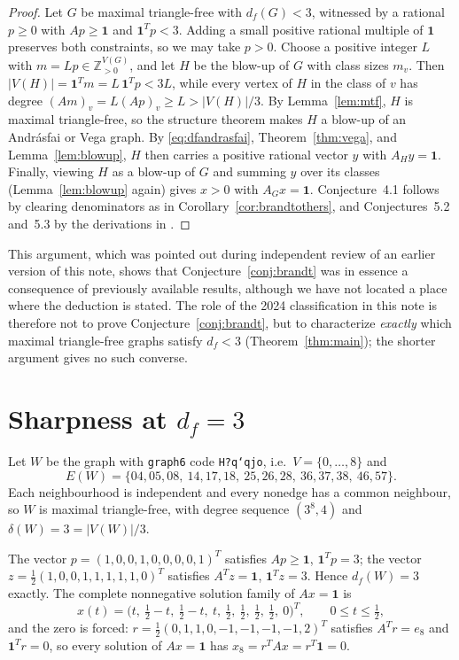 \documentclass[11pt]{article}
\theoremstyle{definition}
\theoremstyle{remark}
\newcommand{\df}{d_f}
\newcommand{\ones}{\mathbf 1}
\begin{document}
\begin{proof}
Let $G$ be maximal triangle-free with $\df(G)<3$, witnessed by a rational $p\ge0$ with
$Ap\ge\ones$ and $\ones^Tp<3$. Adding a small positive rational multiple of $\ones$
preserves both constraints, so we may take $p>0$. Choose a positive integer $L$ with
$m=Lp\in\mathbb Z_{>0}^{V(G)}$, and let $H$ be the blow-up of $G$ with class sizes $m_v$.
Then $|V(H)|=\ones^Tm=L\,\ones^Tp<3L$, while every vertex of $H$ in the class of $v$ has
degree $(Am)_v=L(Ap)_v\ge L>|V(H)|/3$. By Lemma~\ref{lem:mtf}, $H$ is maximal
triangle-free, so the structure theorem makes $H$ a blow-up of an Andr\'asfai or Vega
graph. By \eqref{eq:dfandrasfai}, Theorem~\ref{thm:vega}, and Lemma~\ref{lem:blowup}, $H$
then carries a positive rational vector $y$ with $A_Hy=\ones$. Finally, viewing $H$ as a
blow-up of $G$ and summing $y$ over its classes (Lemma~\ref{lem:blowup} again) gives $x>0$
with $A_Gx=\ones$. Conjecture~4.1 follows by clearing denominators as in
Corollary~\ref{cor:brandtothers}, and Conjectures~5.2 and~5.3 by the derivations in
\cite[Section~5]{Brandt2002}.
\end{proof}

This argument, which was pointed out during independent review of an earlier version of
this note, shows that Conjecture~\ref{conj:brandt} was in essence a consequence of
previously available results, although we have not located a place where the deduction is
stated. The role of the 2024 classification \cite{LPR} in this note is therefore not to
prove Conjecture~\ref{conj:brandt}, but to characterize \emph{exactly} which maximal
triangle-free graphs satisfy $\df<3$ (Theorem~\ref{thm:main}); the shorter argument gives
no such converse.

\section{Sharpness at $\df=3$}\label{sec:sharp}

Let $W$ be the graph with \texttt{graph6} code \texttt{H?q`qjo}, i.e.\ $V=\{0,\dots,8\}$ and
\[
E(W)=\{04,05,08,\ 14,17,18,\ 25,26,28,\ 36,37,38,\ 46,57\}.
\]
Each neighbourhood is independent and every nonedge has a common neighbour, so $W$ is
maximal triangle-free, with degree sequence $(3^8,4)$ and $\delta(W)=3=|V(W)|/3$.

The vector $p=(1,0,0,1,0,0,0,0,1)^T$ satisfies $Ap\ge\ones$, $\ones^Tp=3$; the vector
$z=\tfrac12(1,0,0,1,1,1,1,1,0)^T$ satisfies $A^Tz=\ones$, $\ones^Tz=3$. Hence $\df(W)=3$
exactly. The complete nonnegative solution family of $Ax=\ones$ is
\[
x(t)=\bigl(t,\ \tfrac12-t,\ \tfrac12-t,\ t,\ \tfrac12,\ \tfrac12,\ \tfrac12,\ \tfrac12,\ 0\bigr)^T,
\qquad 0\le t\le\tfrac12,
\]
and the zero is forced: $r=\tfrac12(0,1,1,0,-1,-1,-1,-1,2)^T$ satisfies $A^Tr=e_8$ and
$\ones^Tr=0$, so every solution of $Ax=\ones$ has $x_8=r^TAx=r^T\ones=0$.
\end{document}
